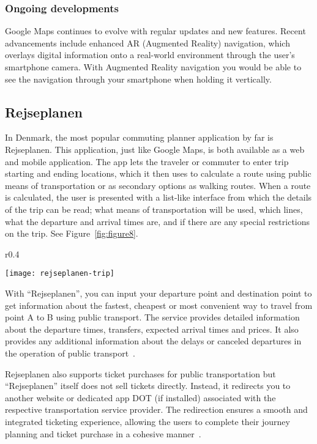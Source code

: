 \subsubsection{Ongoing developments}

Google Maps continues to evolve with regular updates and new features.
Recent advancements include enhanced AR (Augmented Reality) navigation, which overlays digital information onto
a real-world environment through the user's smartphone camera.
With Augmented Reality navigation you would be able to see the navigation through your smartphone when holding it
vertically. \cite{googlemapsAR2023}

\subsection{Rejseplanen}\label{subsec:rejseplanen}

In Denmark, the most popular commuting planner application by far is Rejseplanen.
This application, just like Google Maps, is both available as a web and mobile application.
The app lets the traveler or commuter to enter trip starting and ending locations, which it then uses to calculate a
route using public means of transportation or as secondary options as walking routes.
When a route is calculated, the user is presented with a list-like interface from which the details of the trip can be
read; what means of transportation will be used, which lines, what the departure and arrival times are, and if there are
any special restrictions on the trip.
See Figure~\ref{fig:figure8}.

\begin{wrapfigure}{r}{0.4\textwidth}
    \begin{center}
        \texttt{[image: rejseplanen-trip]}
    \end{center}
    \caption{Rejseplanen mobile UI trip planner.}
    \label{fig:figure8}
\end{wrapfigure}

With ``Rejseplanen'', you can input your departure point and destination point to get information about the fastest,
cheapest or most convenient way to travel from point A to B using public transport.
The service provides detailed information about the departure times, transfers, expected arrival times and prices.
It also provides any additional information about the delays or canceled departures in the operation of public
transport~\cite{rejseplanen2023}.

Rejseplanen also supports ticket purchases for public transportation but ``Rejseplanen'' itself does not sell tickets
directly.
Instead, it redirects you to another website or dedicated app DOT (if installed) associated with the respective
transportation service provider.
The redirection ensures a smooth and integrated ticketing experience, allowing the users to complete their journey
planning and ticket purchase in a cohesive manner~\cite{rejseplanen2023}.

